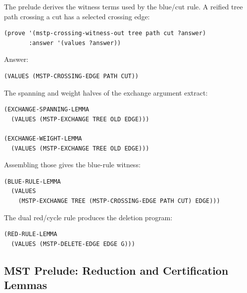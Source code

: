 \documentclass[runningheads]{llncs}
\begin{document}
The prelude derives the witness terms used by the blue/cut rule.  A reified
tree path crossing a cut has a selected crossing edge:
\begin{lstlisting}
(prove '(mstp-crossing-witness-out tree path cut ?answer)
       :answer '(values ?answer))
\end{lstlisting}
Answer:
\begin{lstlisting}
(VALUES (MSTP-CROSSING-EDGE PATH CUT))
\end{lstlisting}
The spanning and weight halves of the exchange argument extract:
\begin{lstlisting}
(EXCHANGE-SPANNING-LEMMA
  (VALUES (MSTP-EXCHANGE TREE OLD EDGE)))

(EXCHANGE-WEIGHT-LEMMA
  (VALUES (MSTP-EXCHANGE TREE OLD EDGE)))
\end{lstlisting}
Assembling those gives the blue-rule witness:
\begin{lstlisting}
(BLUE-RULE-LEMMA
  (VALUES
    (MSTP-EXCHANGE TREE (MSTP-CROSSING-EDGE PATH CUT) EDGE)))
\end{lstlisting}
The dual red/cycle rule produces the deletion program:
\begin{lstlisting}
(RED-RULE-LEMMA
  (VALUES (MSTP-DELETE-EDGE EDGE G)))
\end{lstlisting}

\subsection{MST Prelude: Reduction and Certification Lemmas}
\end{document}

